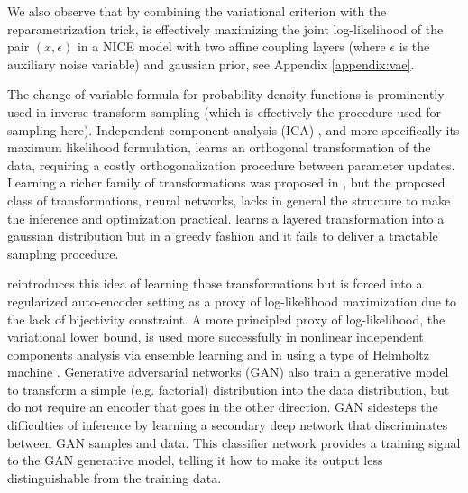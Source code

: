 \documentclass{article}
\begin{document}
We also observe that by combining the variational criterion with
the reparametrization trick, \citep{Kingma+Welling-ICLR2014} is
effectively maximizing the joint log-likelihood of the pair $(x, \epsilon)$ in a NICE model
with two affine coupling layers (where $\epsilon$ is the auxiliary noise variable) and gaussian prior, see Appendix \ref{appendix:vae}.



The change of variable formula for probability density functions is
prominently used in inverse transform sampling (which is effectively the
procedure used for sampling here). Independent component analysis (ICA)
\citep{hyvarinen2000independent}, and more specifically its maximum
likelihood formulation, learns an orthogonal transformation of the data,
requiring a costly orthogonalization procedure between parameter updates.
Learning a richer family of transformations was proposed in \citep{Bengio91},
but the proposed class of
transformations, neural networks, lacks in general the structure to make the inference
and optimization practical. \citep{chen2000gaussianization} learns a
layered transformation into a gaussian distribution but in a greedy fashion and it fails to deliver a tractable sampling procedure.

\citep{rippel2013high} reintroduces this idea of learning those transformations
but is forced into a regularized
auto-encoder setting as a proxy of log-likelihood maximization due to the lack of
bijectivity constraint. A more principled
proxy of log-likelihood, the variational lower bound, is used more successfully in
nonlinear independent components analysis \citep{hyvarinen1999nonlinear}
via ensemble learning \citep{roberts2001independent, lappalainen2000nonlinear} and in
\citep{Kingma+Welling-ICLR2014, Rezende-et-al-arxiv2014} using a type of Helmholtz machine \citep{Dayan95}.
Generative adversarial networks (GAN) \citep{Goodfellow-et-al-ARXIV2014} also
train a generative model to transform a simple 
(e.g. factorial) distribution into the data distribution, but do not require an encoder that
goes in the other direction. GAN sidesteps the difficulties of
inference by learning a secondary deep network that discriminates
between GAN samples and data.
This classifier network provides a training signal to the GAN generative model,
telling it how to make its output less distinguishable from the training data.
\end{document}
